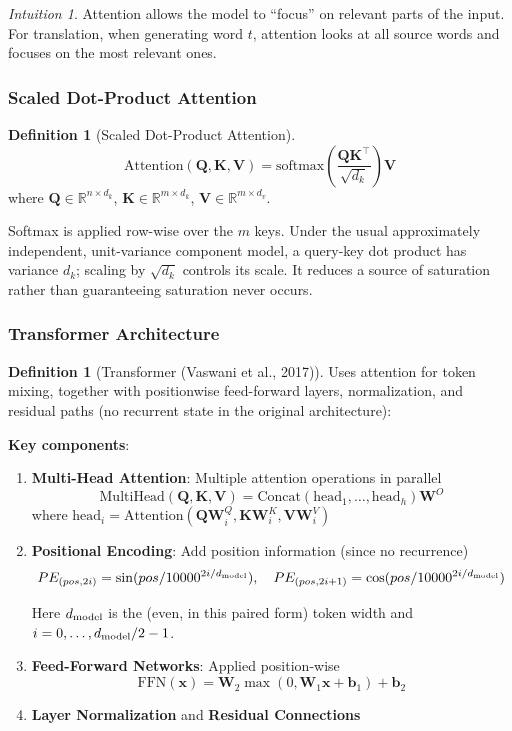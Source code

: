 \documentclass[11pt,twoside]{article}
\numberwithin{equation}{section}
\newcommand{\R}{\mathbb{R}}
\newcommand{\vect}[1]{\bm{#1}}
\theoremstyle{plain}
\theoremstyle{definition}
\newtheorem{definition}[theorem]{Definition}
\theoremstyle{remark}
\newtheorem{intuition}[theorem]{Intuition}
\begin{document}
\begin{intuition}
Attention allows the model to ``focus'' on relevant parts of the input. For translation, when generating word $t$, attention looks at all source words and focuses on the most relevant ones.
\end{intuition}

\subsubsection{Scaled Dot-Product Attention}

\begin{definition}[Scaled Dot-Product Attention]
\[
\text{Attention}(\vect{Q}, \vect{K}, \vect{V}) = \text{softmax}\left(\frac{\vect{Q}\vect{K}^\top}{\sqrt{d_k}}\right)\vect{V}
\]
where $\vect{Q} \in \R^{n \times d_k}$, $\vect{K} \in \R^{m \times d_k}$, $\vect{V} \in \R^{m \times d_v}$.

Softmax is applied row-wise over the $m$ keys. Under the usual approximately independent, unit-variance component model, a query-key dot product has variance $d_k$; scaling by $\sqrt{d_k}$ controls its scale. It reduces a source of saturation rather than guaranteeing saturation never occurs.
\end{definition}

\subsubsection{Transformer Architecture}

\begin{definition}[Transformer (Vaswani et al., 2017)]
Uses attention for token mixing, together with positionwise feed-forward layers, normalization, and residual paths (no recurrent state in the original architecture):

\textbf{Key components}:
\begin{enumerate}
\item \textbf{Multi-Head Attention}: Multiple attention operations in parallel
\[
\text{MultiHead}(\vect{Q}, \vect{K}, \vect{V}) = \text{Concat}(\text{head}_1, \ldots, \text{head}_h)\vect{W}^O
\]
where $\text{head}_i = \text{Attention}(\vect{Q}\vect{W}_i^Q, \vect{K}\vect{W}_i^K, \vect{V}\vect{W}_i^V)$

\item \textbf{Positional Encoding}: Add position information (since no recurrence)
\[
PE_{(pos, 2i)} = \sin(pos/10000^{2i/d_{\rm model}}),\quad
PE_{(pos, 2i+1)} = \cos(pos/10000^{2i/d_{\rm model}})
\]

Here $d_{\rm model}$ is the (even, in this paired form) token width and $i=0,\ldots,d_{\rm model}/2-1$.

\item \textbf{Feed-Forward Networks}: Applied position-wise
\[
\text{FFN}(\vect{x}) = \vect{W}_2\max(0,\vect{W}_1\vect{x}+\vect{b}_1)+\vect{b}_2
\]

\item \textbf{Layer Normalization} and \textbf{Residual Connections}
\end{enumerate}
\end{definition}
\end{document}
